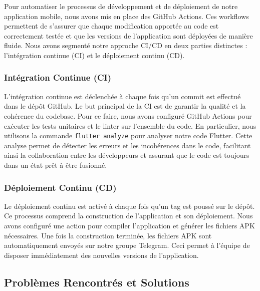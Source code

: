 Pour automatiser le processus de développement et de déploiement de notre application mobile, nous avons mis en place des GitHub Actions. Ces workflows permettent de s'assurer que chaque modification apportée au code est correctement testée et que les versions de l'application sont déployées de manière fluide. Nous avons segmenté notre approche CI/CD en deux parties distinctes : l'intégration continue (CI) et le déploiement continu (CD).

\subsubsection{Intégration Continue (CI)}

L'intégration continue est déclenchée à chaque fois qu'un commit est effectué dans le dépôt GitHub. Le but principal de la CI est de garantir la qualité et la cohérence du codebase. Pour ce faire, nous avons configuré GitHub Actions pour exécuter les tests unitaires et le linter sur l'ensemble du code. En particulier, nous utilisons la commande \texttt{flutter analyze} pour analyser notre code Flutter. Cette analyse permet de détecter les erreurs et les incohérences dans le code, facilitant ainsi la collaboration entre les développeurs et assurant que le code est toujours dans un état prêt à être fusionné.

\subsubsection{Déploiement Continu (CD)}

Le déploiement continu est activé à chaque fois qu'un tag est poussé sur le dépôt. Ce processus comprend la construction de l'application et son déploiement. Nous avons configuré une action pour compiler l'application et générer les fichiers APK nécessaires. Une fois la construction terminée, les fichiers APK sont automatiquement envoyés sur notre groupe Telegram. Ceci permet à l'équipe de disposer immédiatement des nouvelles versions de l'application.

\subsection{Problèmes Rencontrés et Solutions}

